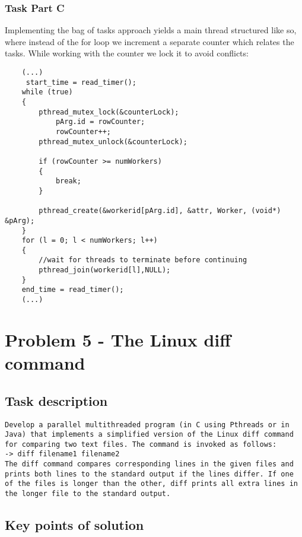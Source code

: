 \documentclass[a4paper,11pt]{article}
\begin{document}
\subsubsection*{Task Part C}
Implementing the bag of tasks approach yields a main thread structured like so, where instead of the for loop we increment a separate counter which relates the tasks. While working with the counter we lock it to avoid conflicts:
\begin{verbatim}
    (...)
     start_time = read_timer();
    while (true)
    {
        pthread_mutex_lock(&counterLock);
            pArg.id = rowCounter;
            rowCounter++;
        pthread_mutex_unlock(&counterLock);
    
        if (rowCounter >= numWorkers)
        {
            break;
        }
    
        pthread_create(&workerid[pArg.id], &attr, Worker, (void*) &pArg);
    }
    for (l = 0; l < numWorkers; l++)
    {
        //wait for threads to terminate before continuing 
        pthread_join(workerid[l],NULL);
    }
    end_time = read_timer();
    (...)
\end{verbatim}

\section*{Problem 5 - The Linux diff command}

\subsection*{Task description}

\begin{verbatim}
Develop a parallel multithreaded program (in C using Pthreads or in Java) that implements a simplified version of the Linux diff command for comparing two text files. The command is invoked as follows:
-> diff filename1 filename2
The diff command compares corresponding lines in the given files and prints both lines to the standard output if the lines differ. If one of the files is longer than the other, diff prints all extra lines in the longer file to the standard output.
\end{verbatim}

\subsection*{Key points of solution}
\end{document}
